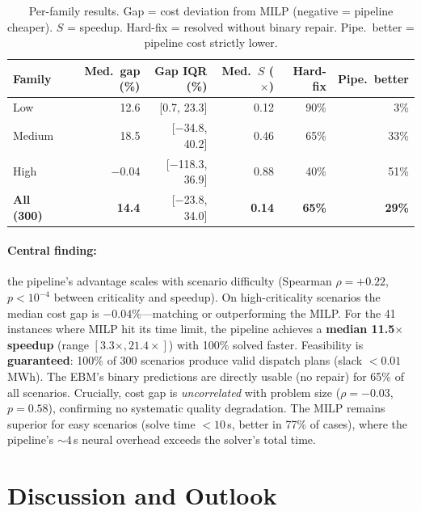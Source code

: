 \documentclass[10pt]{article}
\begin{document}
\begin{table}[t]
\centering
\small
\setlength{\tabcolsep}{4pt}
\begin{tabular}{lrrrrr}
\toprule
\textbf{Family} & \textbf{Med.\ gap (\%)} & \textbf{Gap IQR (\%)} & \textbf{Med.\ $S$ ($\times$)} & \textbf{Hard-fix} & \textbf{Pipe.\ better} \\
\midrule
Low      & 12.6   & [0.7, 23.3]       & 0.12  & 90\% & 3\% \\
Medium   & 18.5   & [$-$34.8, 40.2]   & 0.46  & 65\% & 33\% \\
High     & $-$0.04 & [$-$118.3, 36.9] & 0.88  & 40\% & 51\% \\
\midrule
\textbf{All (300)} & \textbf{14.4} & [$-$23.8, 34.0] & \textbf{0.14} & \textbf{65\%} & \textbf{29\%} \\
\bottomrule
\end{tabular}
\caption{Per-family results. Gap = cost deviation from MILP (negative = pipeline cheaper). $S$ = speedup. Hard-fix = resolved without binary repair. Pipe.\ better = pipeline cost strictly lower.}
\label{tab:main_results}
\end{table}

\vspace{-4pt}
\paragraph{Central finding:} the pipeline's advantage scales with scenario difficulty (Spearman $\rho = +0.22$, $p{<}10^{-4}$ between criticality and speedup). On high-criticality scenarios the median cost gap is $-0.04\%$---matching or outperforming the MILP. For the 41 instances where MILP hit its time limit, the pipeline achieves a \textbf{median 11.5$\times$ speedup} (range $[3.3\times, 21.4\times]$) with 100\% solved faster. Feasibility is \textbf{guaranteed}: 100\% of 300 scenarios produce valid dispatch plans (slack $<0.01$\,MWh). The EBM's binary predictions are directly usable (no repair) for 65\% of all scenarios. Crucially, cost gap is \emph{uncorrelated} with problem size ($\rho{=}{-}0.03$, $p{=}0.58$), confirming no systematic quality degradation. The MILP remains superior for easy scenarios (solve time $<10$\,s, better in 77\% of cases), where the pipeline's ${\sim}4$\,s neural overhead exceeds the solver's total time.

\section{Discussion and Outlook}
\end{document}
